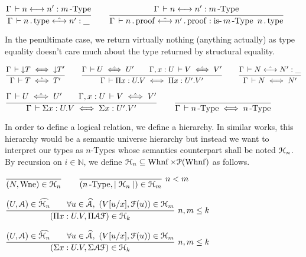 \documentclass[a4paper,english]{lipics-utf8x}
\begin{document}
  \begin{center}
  \(
    \ru{\Gamma \der n \steq n' : \nType{m}
      }{\Gamma \der n \gettype \hsteq n' : \_}
    \qquad
    \ru{\Gamma \der n \steq n' : \nType{m}
      }{\Gamma \der n \getproof \hsteq n' \getproof : \isnType{m}{n \gettype}}
  \)
  \end{center}

  In the penultimate case, we return virtually nothing (anything actually) as
  type equality doesn't care much about the type returned by structural
  equality.


  \begin{center}
  \(
    \ru{\Gamma \der \red T \iff \red T'
      }{\Gamma \der T \hiff T'}
    \qquad
    \ru{\Gamma \der U \hiff U' \qquad
        \Gamma, x:U \der V \hiff V'
      }{\Gamma \der \Pi x:U.V \iff \Pi x:U'.V'}
    \qquad
    \ru{\Gamma \der N \hsteq N' : \_
      }{\Gamma \der N \iff N'}
  \)
  \end{center}

  \begin{center}
  \(
    \ru{\Gamma \der U \hiff U' \qquad
        \Gamma, x:U \der V \hiff V'
      }{\Gamma \der \Sigma x:U.V \iff \Sigma x:U'.V'}
    \qquad
    \ru{}{\Gamma \der \nType{n} \iff \nType{n}}
  \)
  \end{center}


  In order to define a logical relation, we define a hierarchy.
  In similar works, this hierarchy would be a semantic universe hierarchy but
  instead we want to interpret our types as $n$-Types whose semantics
  counterpart shall be noted $\mathcal{H}_n$.
  By recursion on $i \in \mathbb{N}$, we define
  $\mathcal{H}_n \subseteq \operatorname{Whnf} \times \mathcal{P}(\operatorname{Whnf})$ as follows.

  \begin{center}
  \(
    \ru{}{(N, \Wne) \in \Hu_n}
    \qquad
    \rux{}{(\nType{n}, \mid \Hu_n \mid) \in \Hu_m}{n < m}
  \)
  \end{center}

  \begin{center}
  \(
    \rux{(U, \mathcal{A}) \in \widehat{\Hu_n} \qquad
        \forall u \in \widehat{\mathcal{A}},\ (V[u/x], \mathcal{F}(u)) \in \Hu_m
       }{(\Pi x:U.V, \Pi \mathcal{A} \mathcal{F}) \in \Hu_k
       }{n,m \le k}
  \)
  \end{center}

  \begin{center}
  \(
    \rux{(U, \mathcal{A}) \in \widehat{\Hu_n} \qquad
        \forall u \in \widehat{\mathcal{A}},\ (V[u/x], \mathcal{F}(u)) \in \Hu_m
       }{(\Sigma x:U.V, \Sigma \mathcal{A} \mathcal{F}) \in \Hu_k
       }{n,m \le k}
  \)
  \end{center}
\end{document}

